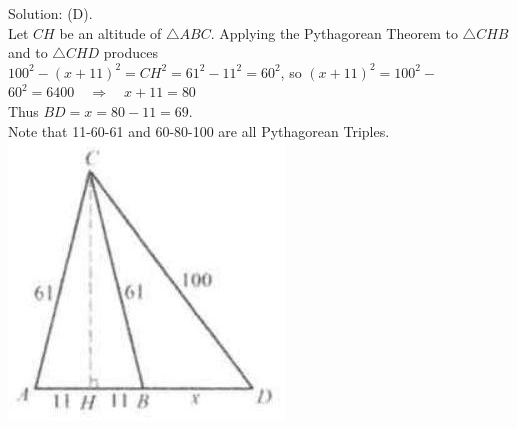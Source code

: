 \documentclass{article}
\begin{document}
Solution: (D).\\
Let \(C H\) be an altitude of \(\triangle A B C\). Applying the Pythagorean Theorem to \(\triangle C H B\) and to \(\triangle C H D\) produces\\
\(100^{2}-(x+11)^{2}=C H^{2}=61^{2}-11^{2}=60^{2}\), so \((x+11)^{2}=100^{2}-\) \(60^{2}=6400 \quad \Rightarrow \quad x+11=80\)\\
Thus \(B D=x=80-11=69\).\\
Note that 11-60-61 and 60-80-100 are all Pythagorean Triples.\\
\centering
\includegraphics[width=\textwidth]{images/081.jpg}
\end{document}
